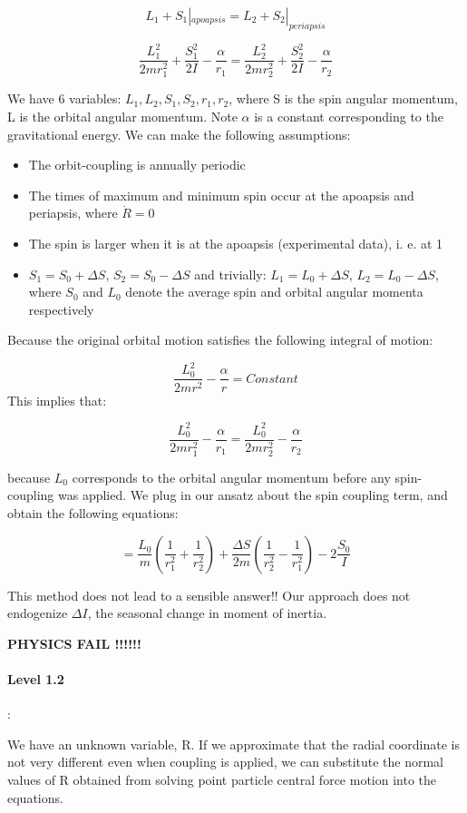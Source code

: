 \documentclass[12pt]{article}
\begin{document}
\begin{equation}
    L_1 + S_1|_{apoapsis} = L_2 + S_2|_{periapsis}
\end{equation}

\begin{equation}
    \frac{L_1^2}{2mr_1^2}+ \frac{S_1^2}{2I}- \frac{\alpha}{r_1}= \frac{L_2^2}{2mr_2^2} + \frac{S_2^2}{2I}- \frac{\alpha}{r_2}
\end{equation}

We have 6 variables: $L_1, L_2, S_1, S_2, r_1, r_2$, where S is the spin angular momentum, L is
the orbital angular momentum.  Note $\alpha $ is a constant corresponding to the gravitational energy. We can make the following assumptions:

\begin{itemize}
\item The orbit-coupling is annually periodic
\item The times of maximum and minimum spin occur at the apoapsis and periapsis, where $\dot{R}= 0$
\item The spin is larger when it is at the apoapsis (experimental data), i. e. at 1
\item $S_1 = S_0 + \Delta S$, $S_2 = S_0 - \Delta S$ and trivially: $L_1 = L_0 + \Delta S$, $L_2 = L_0 - \Delta S$, where $S_0$ and $L_0$ denote the average spin and orbital angular momenta respectively
\end{itemize}


Because the original orbital motion satisfies the following integral of motion:

\begin{equation}
    \frac{L_0^2}{2 m r^2} - \frac{\alpha}{r} = Constant
\end{equation}
This implies that:

\begin{equation}
    \frac{L_0^2}{2mr_1^2} - \frac{\alpha}{r_1} = \frac{L_0^2}{2m r_2^2}- \frac{\alpha}{r_2}
\end{equation}

because $L_0$ corresponds to the orbital angular momentum before any spin-coupling was applied.  We plug in our ansatz  %
about the spin coupling term, and obtain the following equations:

\begin{equation}
    = \frac{L_0}{m}  \left(\frac{1}{r_1^2}+ \frac{1}{r_2^2} \right) + \frac{\Delta S}{2m} (\frac{1}{r_2^2}- \frac{1}{r_1^2}) - 2 \frac{S_0}{I}
\end{equation}

This method does not lead to a sensible answer!!  Our approach does not endogenize $\Delta I$, the seasonal change in moment of inertia.

{\bf PHYSICS FAIL !!!!!!}

\paragraph{Level 1.2}:

We have an unknown variable, R.  If we approximate that the radial coordinate is not very different even when coupling is applied, we can substitute the normal values of R obtained from solving point particle central force motion into the equations. 
\end{document}
